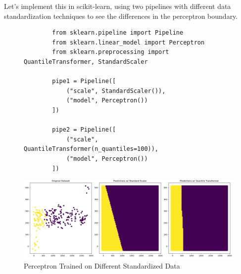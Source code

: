   \begin{code}
    Let's implement this in scikit-learn, using two pipelines with different data standardization techniques to see the differences in the perceptron boundary. 

    \begin{figure}[H]
      \centering 
      \begin{lstlisting}
        from sklearn.pipeline import Pipeline 
        from sklearn.linear_model import Perceptron
        from sklearn.preprocessing import QuantileTransformer, StandardScaler

        pipe1 = Pipeline([ 
            ("scale", StandardScaler()), 
            ("model", Perceptron())
        ])

        pipe2 = Pipeline([
            ("scale", QuantileTransformer(n_quantiles=100)), 
            ("model", Perceptron())
        ])
      \end{lstlisting}
      \caption{} 
      \label{fig:Perceptron_Code}
    \end{figure}

    \begin{figure}[H]
      \centering
      \includegraphics[scale=0.35]{img/Perceptron.png}
      \caption{Perceptron Trained on Different Standardized Data}
      \label{fig:Percepton_on_Standardized_data}
    \end{figure}
  \end{code}

